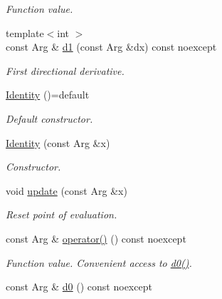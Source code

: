\begin{DoxyCompactItemize}
\begin{DoxyCompactList}\small\item\em Function value. \end{DoxyCompactList}\item 
\hypertarget{structRFFGen_1_1Identity_a0a2fba6a1d3326df7de1f329e20dd557}{{\footnotesize template$<$int $>$ }\\const Arg \& \hyperlink{structRFFGen_1_1Identity_a0a2fba6a1d3326df7de1f329e20dd557}{d1} (const Arg \&dx) const noexcept}\label{structRFFGen_1_1Identity_a0a2fba6a1d3326df7de1f329e20dd557}

\begin{DoxyCompactList}\small\item\em First directional derivative. \end{DoxyCompactList}\item 
\hypertarget{structRFFGen_1_1Identity_a8b78693b14060a66fe32e8a15df1873a}{\hyperlink{structRFFGen_1_1Identity_a8b78693b14060a66fe32e8a15df1873a}{Identity} ()=default}\label{structRFFGen_1_1Identity_a8b78693b14060a66fe32e8a15df1873a}

\begin{DoxyCompactList}\small\item\em Default constructor. \end{DoxyCompactList}\item 
\hyperlink{structRFFGen_1_1Identity_ad1206bbe037c72a77aa90119f228f9e2}{Identity} (const Arg \&x)
\begin{DoxyCompactList}\small\item\em Constructor. \end{DoxyCompactList}\item 
\hypertarget{structRFFGen_1_1Identity_a0ddfb34c7d8f2edb9648dedf046164c8}{void \hyperlink{structRFFGen_1_1Identity_a0ddfb34c7d8f2edb9648dedf046164c8}{update} (const Arg \&x)}\label{structRFFGen_1_1Identity_a0ddfb34c7d8f2edb9648dedf046164c8}

\begin{DoxyCompactList}\small\item\em Reset point of evaluation. \end{DoxyCompactList}\item 
\hypertarget{structRFFGen_1_1Identity_a2640817a78171e80daabf623f2c786d5}{const Arg \& \hyperlink{structRFFGen_1_1Identity_a2640817a78171e80daabf623f2c786d5}{operator()} () const noexcept}\label{structRFFGen_1_1Identity_a2640817a78171e80daabf623f2c786d5}

\begin{DoxyCompactList}\small\item\em Function value. Convenient access to \hyperlink{structRFFGen_1_1Identity_a41c728eda635f547da2a0b697876ca63}{d0()}. \end{DoxyCompactList}\item 
\hypertarget{structRFFGen_1_1Identity_a41c728eda635f547da2a0b697876ca63}{const Arg \& \hyperlink{structRFFGen_1_1Identity_a41c728eda635f547da2a0b697876ca63}{d0} () const noexcept}\label{structRFFGen_1_1Identity_a41c728eda635f547da2a0b697876ca63}


\end{DoxyCompactItemize}
